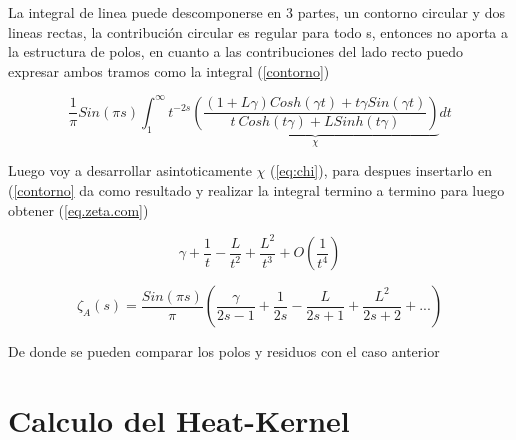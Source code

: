 La integral de linea puede descomponerse en 3 partes, un contorno circular y dos lineas rectas, la contribución circular es regular para todo s, entonces no aporta a la estructura de polos, en cuanto a las contribuciones del lado recto puedo expresar ambos tramos como la integral (\ref{contorno}) 

\begin{equation}
    \frac{1}{ \pi } 
    Sin(\pi s)
    \int _1 ^{\infty} 
    t ^{-2s}
    \underbrace{
    \left( 
    \frac{(1+L \gamma) Cosh( \gamma t)+ t \gamma Sin(\gamma t)}
    {t \ Cosh(t \gamma)+ L Sinh(t \gamma)}
    \right)} _{\chi}
    dt 
\label{contorno}
\end{equation}

Luego voy a desarrollar asintoticamente  $\chi$  (\ref{eq:chi}), para despues insertarlo en (\ref{contorno} da como resultado y realizar la integral termino a termino para luego obtener (\ref{eq.zeta.com})

\begin{equation}
    \gamma + \frac{1}{t}-\frac{L}{t^2}+\frac{L^2}{t^3}+O(\frac{1}{t^4})
\label{eq:chi}
\end{equation}

\begin{equation}
    \zeta _A (s) = 
    \frac{Sin(\pi s)}{\pi}
    \left(
    \frac{\gamma}{2s-1} + 
    \frac{1}{2s} -
    \frac{L}{2s+1} +
    \frac{L^2}{2s+2} + ...
    \right)
\label{eq.zeta.com}
\end{equation}

De donde se pueden comparar los polos y residuos con el caso anterior 

\section{Calculo del Heat-Kernel}

